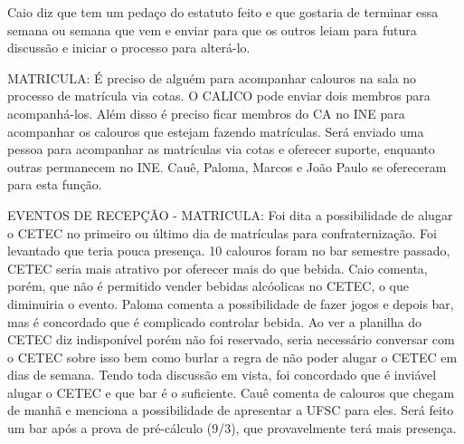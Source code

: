 \documentclass{ata-calico}
\begin{document}
\maketitle

Caio diz que tem um pedaço do estatuto feito e que gostaria de terminar essa semana ou semana que vem e enviar para que os outros leiam para futura discussão e iniciar o processo para alterá-lo.


MATRICULA: É preciso de alguém para acompanhar calouros na sala no processo de matrícula via cotas. O CALICO pode enviar dois membros para acompanhá-los. Além disso é preciso ficar membros do CA no INE para acompanhar os calouros que estejam fazendo matrículas. Será enviado uma pessoa para acompanhar as matrículas via cotas e oferecer suporte, enquanto outras permanecem no INE. Cauê, Paloma, Marcos e João Paulo se ofereceram para esta função.\newline

EVENTOS DE RECEPÇÃO - MATRICULA: Foi dita a possibilidade de alugar o CETEC no primeiro ou último dia de matrículas para confraternização. Foi levantado que teria pouca presença. 10 calouros foram no bar semestre passado, CETEC seria mais atrativo por oferecer mais do que bebida. Caio comenta, porém, que não é permitido vender bebidas alcóolicas no CETEC, o que diminuiria o evento. Paloma comenta a possibilidade de fazer jogos e depois bar, mas é concordado que é complicado controlar bebida. Ao ver a planilha do CETEC diz indisponível porém não foi reservado, seria necessário conversar com o CETEC sobre isso bem como burlar a regra de não poder alugar o CETEC em dias de semana. Tendo toda discussão em vista, foi concordado que é inviável alugar o CETEC e que bar é o suficiente.  Cauê comenta de calouros que chegam de manhã e menciona a possibilidade de apresentar a UFSC para eles. Será feito um bar após a prova de pré-cálculo (9/3), que provavelmente terá mais presença.\newline
\end{document}
